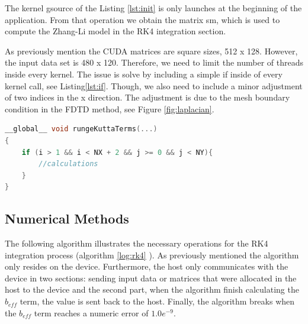 The kernel {\listf gsource} of the Listing \ref{lst:init} is only launches at the beginning of the application. From that operation we obtain the matrix {\listf sm}, which is used to compute the Zhang-Li model in the RK4 integration section.

As previously mention the CUDA matrices are square sizes, 512 x 128. However, the input data set is 480 x 120. Therefore, we need to limit the number of threads inside every kernel. The issue is solve by including a simple {\listf if} inside of every kernel call, see Listing\ref{lst:if}. Though, we also need to include a minor adjustment of two indices in the x direction. The adjustment is due to the mesh boundary condition in the FDTD method, see Figure \ref{fig:laplacian}.

\begin{lstlisting}[language=C++, label={lst:if}, caption={Limits the threads executing inside a kernel}]
__global__ void rungeKuttaTerms(...)
{
    if (i > 1 && i < NX + 2 && j >= 0 && j < NY){
    	//calculations
    }
}
\end{lstlisting}

\subsection{Numerical Methods}

The following algorithm illustrates the necessary operations for the RK4 integration process (algorithm \ref{log:rk4} ). As previously mentioned the algorithm only resides on the device. Furthermore, the host only communicates with the device in two sections: sending input data or matrices that were allocated in the host to the device and the second part, when the algorithm finish calculating the $b_{eff}$ term, the value is sent back to the host. Finally, the algorithm breaks when the $b_{eff}$ term reaches a numeric error of $1.0e^{-9}$.

